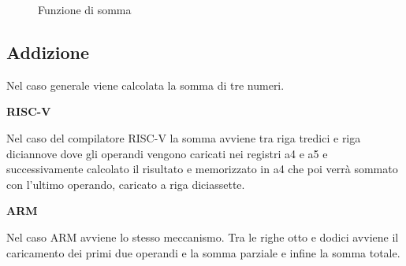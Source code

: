 \documentclass[12pt, a4paper]{report}
\begin{document}
\vspace{0.3 cm}

\begin{figure}[ht]
 
 \begin{subfigure}{0.3\textwidth}
 
 


 \end{subfigure}
 \hfill
 \begin{subfigure}{0.3\textwidth}
 
 


 \end{subfigure}
 \hfill
 \begin{subfigure}{0.3\textwidth}
 
 


 \end{subfigure}
 
 \caption{Funzione di somma}
 
\end{figure}

\subsection{Addizione}
Nel caso generale viene calcolata la somma di tre numeri.



\vspace{0.3 cm}
\textbf{RISC-V}

Nel caso del compilatore RISC-V la somma avviene tra riga tredici e riga diciannove dove gli operandi vengono caricati nei registri a4 e a5 e successivamente calcolato il risultato e memorizzato in a4 che poi verrà sommato con l'ultimo operando, caricato a riga diciassette.

\vspace{0.3 cm}
\textbf{ARM}

Nel caso ARM avviene lo stesso meccanismo. Tra le righe otto e dodici avviene il caricamento dei primi due operandi e la somma parziale e infine la somma totale.
\end{document}
